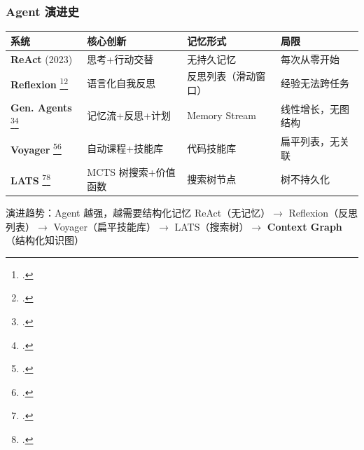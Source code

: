 \documentclass[aspectratio=169,10pt]{beamer}
\let\oldcite\cite
\renewcommand{\cite}[1]{\oldcite{#1}\footcitetext{#1}}
\begin{document}
\begin{frame}
  \frametitle{Agent 演进史}

  \scriptsize
  \renewcommand{\arraystretch}{1.3}
  \centering
  \begin{tabular}{>{\centering}p{2cm}|p{3.5cm}|p{2.5cm}|p{3cm}}
    \textbf{系统} & \textbf{核心创新} & \textbf{记忆形式} & \textbf{局限} \\
    \hline
    \textbf{ReAct} (2023) & 思考+行动交替 & 无持久记忆 & 每次从零开始 \\
    \hline
    \textbf{Reflexion} \cite{shinn2023reflexion} & 语言化自我反思 & 反思列表（滑动窗口） & 经验无法跨任务 \\
    \hline
    \textbf{Gen. Agents} \cite{park2023generative} & 记忆流+反思+计划 & Memory Stream & 线性增长，无图结构 \\
    \hline
    \textbf{Voyager} \cite{wang2024voyager} & 自动课程+技能库 & 代码技能库 & 扁平列表，无关联 \\
    \hline
    \textbf{LATS} \cite{zhou2024lats} & MCTS 树搜索+价值函数 & 搜索树节点 & 树不持久化 \\
  \end{tabular}

  \vspace{0.3cm}

  \begin{alertblock}{演进趋势：Agent 越强，越需要结构化记忆}
    ReAct（无记忆）$\rightarrow$ Reflexion（反思列表）$\rightarrow$ Voyager（扁平技能库）$\rightarrow$ LATS（搜索树）$\rightarrow$ \textbf{Context Graph}（结构化知识图）
  \end{alertblock}
\end{frame}
\end{document}

